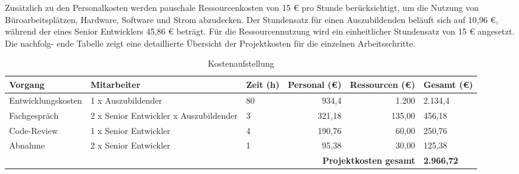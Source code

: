 Zusätzlich zu den Personalkosten werden pauschale Ressourcenkosten von 15 € pro Stunde berücksichtigt, um die Nutzung von Büroarbeitsplätzen, Hardware, Software und Strom abzudecken. Der Stundensatz für einen Auszubildenden beläuft sich auf 10,96 €, während der eines Senior Entwicklers 45,86 € beträgt. Für die Ressourcennutzung wird ein einheitlicher Stundensatz von 15 € angesetzt. Die nachfolg-
ende Tabelle zeigt eine detaillierte Übersicht der Projektkosten für die einzelnen Arbeitsschritte.
\begin{table}[h!]
    \centering
    \footnotesize %
    \renewcommand{\arraystretch}{1.2} %
    \setlength{\tabcolsep}{7pt} %
    \begin{tabular*}{\textwidth}{|p{2.7cm}|p{3.0cm}|p{1.5cm}|r|r|p{1.9cm}|} %
    \hline
    \textbf{Vorgang}       & \textbf{Mitarbeiter}                 & \textbf{Zeit (h)} & \textbf{Personal (€)\footnotemark[6]} & \textbf{Ressourcen (€)\footnotemark[7]} & \textbf{Gesamt (€)} \\ \hline
    Entwicklungskosten     & 1 x Auszubildender                  & 80                & 934,4                 & 1.200                 & 2.134,4           \\ \hline
    Fachgespräch           & 2 x Senior Entwickler\newline 1 x Auszubildender & 3                 & 321,18                 & 135,00                   & 456,18             \\ \hline
    Code-Review            & 1 x Senior Entwickler                      & 4                 & 190,76                 & 60,00                    & 250,76             \\ \hline
    Abnahme                & 2 x Senior Entwickler                      & 1                 & 95,38                  & 30,00                    & 125,38              \\ \hline
    \multicolumn{5}{|r|}{\textbf{Projektkosten gesamt}} & \textbf{2.966,72} \\ \hline
    \end{tabular*}
    \caption{Kostenaufstellung}
    \label{tab:Kostenaufstellung}
\end{table}


